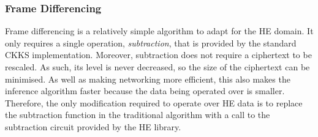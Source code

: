 \setlength{\leftskip}{0cm}
\subsubsection{Frame Differencing}
\setlength{\leftskip}{0.5cm}
\indent \indent
Frame differencing is a relatively simple algorithm to adapt for the HE domain. It only requires a single operation, \textit{subtraction}, that is provided by the standard CKKS implementation. Moreover, subtraction does not require a ciphertext to be rescaled. As such, its level is never decreased, so the size of the ciphertext can be minimised. As well as making networking more efficient, this also makes the inference algorithm faster because the data being operated over is smaller.
\smallskip \\ \indent
Therefore, the only modification required to operate over HE data is to replace the subtraction function in the traditional algorithm with a call to the subtraction circuit provided by the HE library.


\setlength{\leftskip}{0cm}
